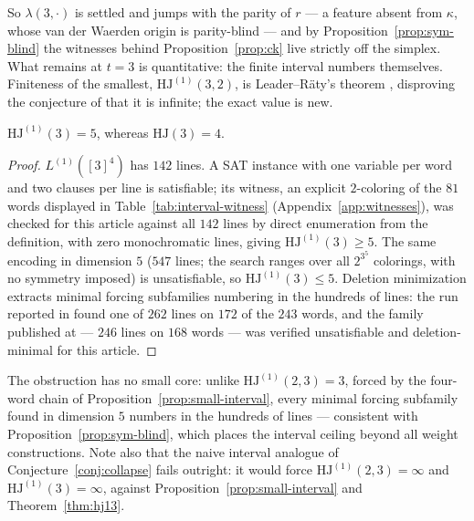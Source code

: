 \documentclass[12pt]{article}
\newcommand{\HJ}{\mathrm{HJ}}
\newcommand{\Ls}{L}
\begin{document}
So $\lambda(3,\cdot)$ is settled and jumps with the parity of $r$ --- a
feature absent from $\kappa$, whose van der Waerden origin is
parity-blind --- and by Proposition~\ref{prop:sym-blind} the witnesses
behind Proposition~\ref{prop:ck} live strictly off the simplex. What
remains at $t=3$ is quantitative: the finite interval numbers
themselves. Finiteness of the smallest, $\HJ^{(1)}(3,2)$, is
Leader--R\"aty's theorem
\cite{leader2018noteintervalshalesjewetttheorem}, disproving the
conjecture of \cite{conlonAndKamcev} that it is infinite; the exact
value is new.

\begin{theorem}\label{thm:hj13}
$\HJ^{(1)}(3)=5$, whereas $\HJ(3)=4$.
\end{theorem}

\begin{proof}
$\Ls^{(1)}([3]^{4})$ has $142$ lines. A SAT instance with one variable
per word and two clauses per line is satisfiable; its witness, an
explicit $2$-coloring of the $81$ words displayed in
Table~\ref{tab:interval-witness} (Appendix~\ref{app:witnesses}), was
checked for this article against all $142$ lines by direct
enumeration from the definition, with zero monochromatic lines, giving
$\HJ^{(1)}(3)\ge 5$. The same encoding in dimension $5$ ($547$ lines;
the search ranges over all $2^{3^{5}}$ colorings, with no symmetry
imposed) is unsatisfiable, so $\HJ^{(1)}(3)\le 5$. Deletion
minimization extracts minimal forcing subfamilies numbering in the
hundreds of lines: the run reported in \cite{thesis} found one of
$262$ lines on $172$ of the $243$ words, and the family published at
\cite{hjcerts} --- $246$ lines on $168$ words --- was verified
unsatisfiable and deletion-minimal for this article.
\end{proof}

\begin{remark}\label{rem:no-core}
The obstruction has no small core: unlike $\HJ^{(1)}(2,3)=3$, forced by
the four-word chain of Proposition~\ref{prop:small-interval}, every
minimal forcing subfamily found in dimension $5$ numbers in the
hundreds of lines --- consistent with Proposition~\ref{prop:sym-blind},
which places the interval ceiling beyond all weight constructions. Note
also that the naive interval analogue of
Conjecture~\ref{conj:collapse} fails outright: it would force
$\HJ^{(1)}(2,3)=\infty$ and $\HJ^{(1)}(3)=\infty$, against
Proposition~\ref{prop:small-interval} and Theorem~\ref{thm:hj13}.
\end{remark}
\end{document}
